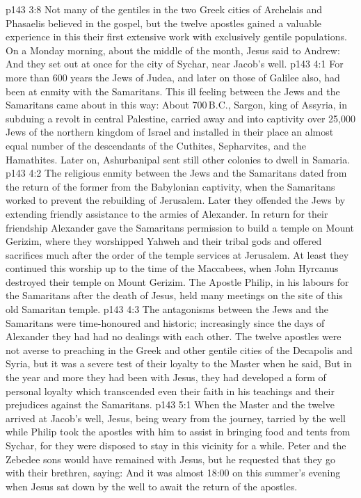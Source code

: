 \vs p143 3:8 \pc Not many of the gentiles in the two Greek cities of Archelais and Phasaelis believed in the gospel, but the twelve apostles gained a valuable experience in this their first extensive work with exclusively gentile populations. On a Monday morning, about the middle of the month, Jesus said to Andrew:  And they set out at once for the city of Sychar, near Jacob’s well.
\vs p143 4:1 For more than 600 years the Jews of Judea, and later on those of Galilee also, had been at enmity with the Samaritans. This ill feeling between the Jews and the Samaritans came about in this way: About 700\,B.C., Sargon, king of Assyria, in subduing a revolt in central Palestine, carried away and into captivity over 25,000 Jews of the northern kingdom of Israel and installed in their place an almost equal number of the descendants of the Cuthites, Sepharvites, and the Hamathites. Later on, Ashurbanipal sent still other colonies to dwell in Samaria.
\vs p143 4:2 The religious enmity between the Jews and the Samaritans dated from the return of the former from the Babylonian captivity, when the Samaritans worked to prevent the rebuilding of Jerusalem. Later they offended the Jews by extending friendly assistance to the armies of Alexander. In return for their friendship Alexander gave the Samaritans permission to build a temple on Mount Gerizim, where they worshipped Yahweh and their tribal gods and offered sacrifices much after the order of the temple services at Jerusalem. At least they continued this worship up to the time of the Maccabees, when John Hyrcanus destroyed their temple on Mount Gerizim. The Apostle Philip, in his labours for the Samaritans after the death of Jesus, held many meetings on the site of this old Samaritan temple.
\vs p143 4:3 The antagonisms between the Jews and the Samaritans were time\hyp{}honoured and historic; increasingly since the days of Alexander they had had no dealings with each other. The twelve apostles were not averse to preaching in the Greek and other gentile cities of the Decapolis and Syria, but it was a severe test of their loyalty to the Master when he said,  But in the year and more they had been with Jesus, they had developed a form of personal loyalty which transcended even their faith in his teachings and their prejudices against the Samaritans.
\vs p143 5:1 When the Master and the twelve arrived at Jacob’s well, Jesus, being weary from the journey, tarried by the well while Philip took the apostles with him to assist in bringing food and tents from Sychar, for they were disposed to stay in this vicinity for a while. Peter and the Zebedee sons would have remained with Jesus, but he requested that they go with their brethren, saying:  And it was almost 18:00 on this summer’s evening when Jesus sat down by the well to await the return of the apostles.
